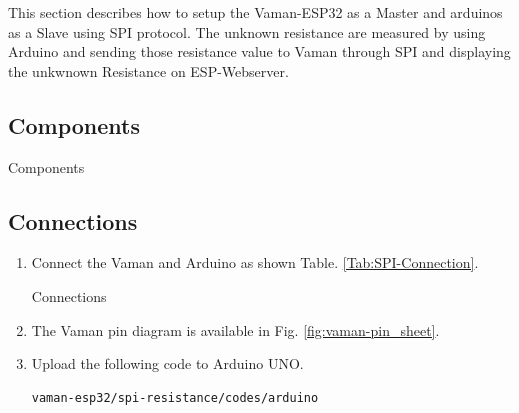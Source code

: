 This section describes how to setup the Vaman-ESP32 as a Master and  arduinos as a Slave using SPI protocol. The  unknown resistance are measured by using Arduino and sending those  resistance value to Vaman through SPI and displaying the unkwnown Resistance on ESP-Webserver.
\subsection{Components}
\begin{table}[!ht]
\centering

\caption{Components}
\label{table:SPI-components}
\end{table}

\subsection{Connections}
\begin{enumerate}[label=\thesection.\arabic*.,ref=\thesection.\theenumi]

\item
Connect the Vaman and Arduino as shown Table. \ref{Tab:SPI-Connection}.

\begin{table}[!ht]
\centering

\caption{Connections}
\label{Tab:SPI-Connection}
\end{table}
\item
The Vaman pin diagram is available in Fig. \ref{fig:vaman-pin_sheet}.

\item Upload the following code to Arduino UNO.
\begin{lstlisting}
vaman-esp32/spi-resistance/codes/arduino
\end{lstlisting}
\end{enumerate}
